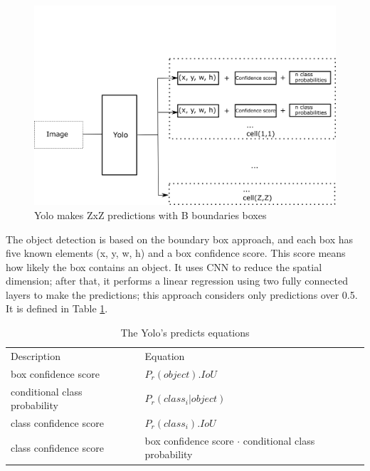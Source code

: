 \begin{figure}[H]
\centering
\includegraphics[scale=0.7]{imagens/yolo_flow.png}
\caption{Yolo makes ZxZ predictions with B boundaries boxes}
\label{fig:yolo_flow}
\end{figure}

The object detection is based on the boundary box approach, and each box has five known elements (x, y, w, h) and a box confidence score. This score means how likely the box contains an object. It uses CNN to reduce the spatial dimension; after that, it performs a linear regression using two fully connected layers to make the predictions; this approach considers only predictions over 0.5. It is defined in Table \ref{eq:prob_yolo}. 


\begin{table}[H]
\centering
\caption{The Yolo's predicts equations}
\begin{tabular}{l|l} 
\toprule
Description~                   & Equation                                                                 \\
box confidence score           & $P_r(object).IoU$                                                     \\
conditional class probability~ & $P_r(class_i|object)$                                       \\
class confidence score         & $P_r(class_i).IoU$                                                   \\
class confidence score         & box confidence score $\cdot$ conditional class probability  \\
\bottomrule
\end{tabular}
\label{eq:prob_yolo}
\end{table}

